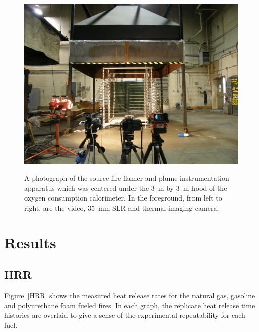 \documentclass[twoside]{uocthesis}
\begin{document}
{\begin{figure}
  \centering
  \includegraphics[width=\textwidth]{../Figures/Source_Fire_Flamer}\\
  \caption[A photograph of the source fire flamer and plume instrumentation apparatus]{A photograph of the source fire flamer and plume instrumentation apparatus which was centered under the 3~m by 3~m hood of the oxygen consumption calorimeter.  In the foreground, from left to right, are the video, 35~mm SLR and thermal imaging camera.}
  \label{Fire_Flamer}
\end{figure}



\chapter{Results}
\label{chapter:Results}

{\section{HRR}

Figure~\ref{HRR} shows the measured heat release rates for the natural gas, gasoline and polyurethane foam fueled fires. In each graph, the replicate heat release time histories are overlaid to give a sense of the experimental repeatability for each fuel.

}}
\end{document}
